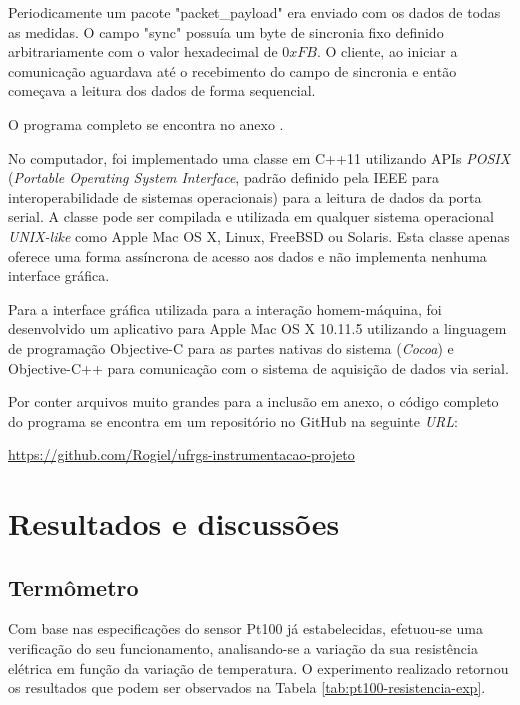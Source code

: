 \documentclass[a4paper]{instrumentacao}
\begin{document}
Periodicamente um pacote "packet\_payload" era enviado com os dados de todas as medidas. O campo "sync" possuía um byte de sincronia fixo definido arbitrariamente com o valor hexadecimal de $0xFB$. O cliente, ao iniciar a comunicação aguardava até o recebimento do campo de sincronia e então começava a leitura dos dados de forma sequencial.

O programa completo se encontra no anexo .

No computador, foi implementado uma classe em C++11 utilizando APIs \textit{POSIX} (\textit{Portable Operating System Interface}, padrão definido pela IEEE para interoperabilidade de sistemas operacionais) para a leitura de dados da porta serial. A classe pode ser compilada e utilizada em qualquer sistema operacional \textit{UNIX-like} como Apple Mac OS X, Linux, FreeBSD ou Solaris. Esta classe apenas oferece uma forma assíncrona de acesso aos dados e não implementa nenhuma interface gráfica.

Para a interface gráfica utilizada para a interação homem-máquina, foi desenvolvido um aplicativo para Apple Mac OS X 10.11.5 utilizando a linguagem de programação Objective-C para as partes nativas do sistema (\textit{Cocoa}) e Objective-C++ para comunicação com o sistema de aquisição de dados via serial.

Por conter arquivos muito grandes para a inclusão em anexo, o código completo do programa se encontra em um repositório no GitHub na seguinte \textit{URL}:

\url{https://github.com/Rogiel/ufrgs-instrumentacao-projeto}

\chapter{Resultados e discussões}

\section{Termômetro}

Com base nas especificações do sensor Pt100 já estabelecidas, efetuou-se uma verificação do seu funcionamento, analisando-se a variação da sua resistência elétrica em função da variação de temperatura. O experimento realizado retornou os resultados que podem ser observados na Tabela \ref{tab:pt100-resistencia-exp}.
\end{document}

